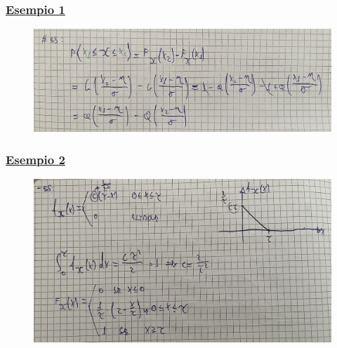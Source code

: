 \documentclass{article}
\begin{document}
\subsubsection{\underline{Esempio 1}}
\begin{figure}[ht]
\centering
\includegraphics[scale=0.12]{ese/15.jpeg}
\end{figure}
\subsubsection{\underline{Esempio 2}}
\begin{figure}[ht]
\centering
\includegraphics[scale=0.12]{ese/16.jpeg}
\end{figure}
\end{document}
